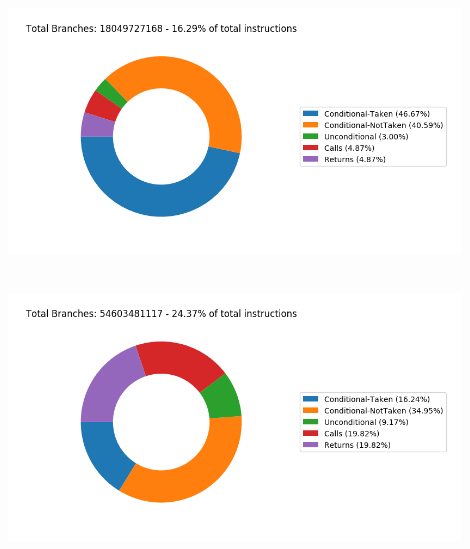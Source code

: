    \begin{minipage}{\textwidth}
      \begin{center}
         \\
         \vspace{3mm}
         \includegraphics[width=0.9\textwidth, frame]{./graphs/4-1/473-astar.png}
         \vspace{6mm}
      \end{center}
   \end{minipage}

   \begin{minipage}{\textwidth}
      \begin{center}
         \\
         \vspace{3mm}
         \includegraphics[width=0.9\textwidth, frame]{./graphs/4-1/483-xalancbmk.png}
         \vspace{6mm}
      \end{center}
   \end{minipage}

